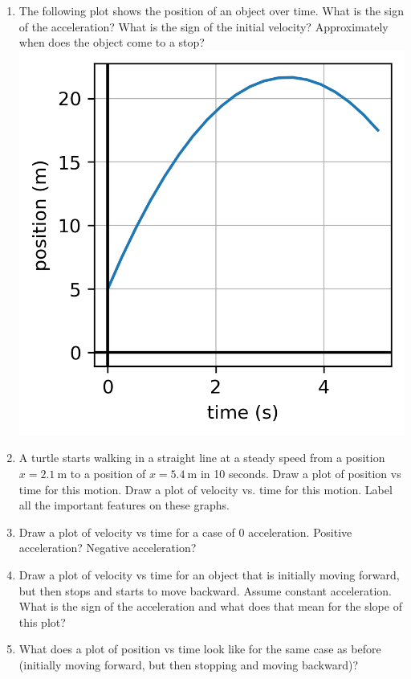 \begin{enumerate}
\item The following plot shows the position of an object over time. What is the sign of the acceleration? What is the sign of the initial velocity? Approximately when does the object come to a stop?\\
\includegraphics[]{week4-x1-t.png}

\item
A turtle starts walking in a straight line at a steady speed from a position $x=\SI{2.1}{\meter}$ to a position of $x=\SI{5.4}{\meter}$ in 10 seconds. Draw a plot of position vs time for this motion. Draw a plot of velocity vs. time for this motion. Label all the important features on these graphs.

\item
Draw a plot of velocity vs time for a case of 0 acceleration. Positive acceleration? Negative acceleration?

\item 
Draw a plot of velocity vs time for an object that is initially moving forward, but then stops and starts to move backward. Assume constant acceleration. What is the sign of the acceleration and what does that mean for the slope of this plot?\bigskip

\item What does a plot of position vs time look like for the same case as before (initially moving forward, but then stopping and moving backward)?\bigskip


\end{enumerate}
